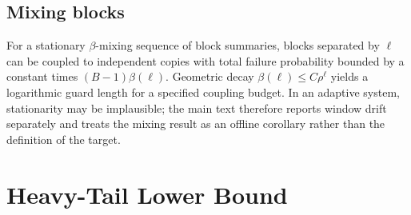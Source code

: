 \subsection{Mixing blocks}
For a stationary $\beta$-mixing sequence of block summaries, blocks separated by $\ell$ can be coupled to independent copies with total failure probability bounded by a constant times $(B-1)\beta(\ell)$. Geometric decay $\beta(\ell)\le C\rho^\ell$ yields a logarithmic guard length for a specified coupling budget. In an adaptive system, stationarity may be implausible; the main text therefore reports window drift separately and treats the mixing result as an offline corollary rather than the definition of the target.

\section{Heavy-Tail Lower Bound}
\label{app:lower}

